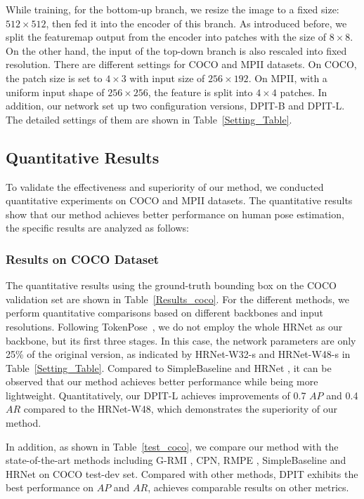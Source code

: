 \documentclass[runningheads]{llncs}
\begin{document}
While training, for the bottom-up branch, we resize the image to a fixed size: $512 \times 512$, then fed it into the encoder of this branch. As introduced before, we split the featuremap output from the encoder into patches with the size of $8 \times 8$. On the other hand, the input of the top-down branch is also rescaled into fixed resolution. There are different settings for COCO and MPII datasets. On COCO, the patch size is set to $4 \times 3$ with input size of $256 \times 192$. On MPII, with a uniform input shape of $256 \times 256$, the feature is split into $4 \times 4$ patches. In addition, our network set up two configuration versions, DPIT-B and DPIT-L. The detailed settings of them are shown in Table~\ref{Setting_Table}.

\subsection{Quantitative Results} \label{sec:eval}
To validate the effectiveness and superiority of our method, we conducted quantitative experiments on COCO and MPII datasets. The quantitative results show that our method achieves better performance on human pose estimation, the specific results are analyzed as follows:

\subsubsection{Results on COCO Dataset}
The quantitative results using the ground-truth bounding box on the COCO validation set are shown in Table~\ref{Results_coco}. For the different methods, we perform quantitative comparisons based on different backbones and input resolutions. Following TokenPose~\cite{Tokenpose2021}, we do not employ the whole HRNet as our backbone, but its first three stages. In this case, the network parameters are only 25\% of the original version, as indicated by HRNet-W32-s and HRNet-W48-s in Table~\ref{Setting_Table}. Compared to SimpleBaseline \cite{simple_baseline2018} and HRNet \cite{HRNet2019}, it can be observed that our method achieves better performance while being more lightweight. Quantitatively, our DPIT-L achieves improvements of 0.7 $AP$ and 0.4 $AR$ compared to the HRNet-W48, which demonstrates the superiority of our method.

In addition, as shown in Table~\ref{test_coco}, we compare our method with the state-of-the-art methods including G-RMI \cite{G-RMI2017}, CPN\cite{CPN2018}, RMPE \cite{RMPE2017}, SimpleBaseline \cite{simple_baseline2018} and HRNet \cite{HRNet2019} on COCO test-dev set. Compared with other methods, DPIT exhibits the best performance on $AP$ and $AR$, achieves comparable results on other metrics.
\end{document}
